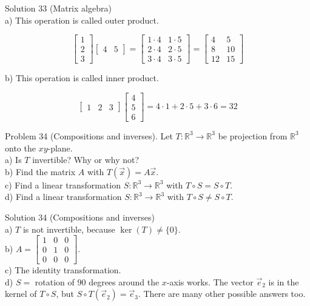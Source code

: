 \documentclass[10pt]{article}
\begin{document}
Solution 33 (Matrix algebra)\\
a) This operation is called outer product.

$$
\left[\begin{array}{l}
1 \\
2 \\
3
\end{array}\right]\left[\begin{array}{ll}
4 & 5
\end{array}\right]=\left[\begin{array}{ll}
1 \cdot 4 & 1 \cdot 5 \\
2 \cdot 4 & 2 \cdot 5 \\
3 \cdot 4 & 3 \cdot 5
\end{array}\right]=\left[\begin{array}{cc}
4 & 5 \\
8 & 10 \\
12 & 15
\end{array}\right]
$$

b) This operation is called inner product.

$$
\left[\begin{array}{lll}
1 & 2 & 3
\end{array}\right]\left[\begin{array}{l}
4 \\
5 \\
6
\end{array}\right]=4 \cdot 1+2 \cdot 5+3 \cdot 6=32
$$

Problem 34 (Compositions and inverses). Let $T: \mathbb{R}^{3} \rightarrow \mathbb{R}^{3}$ be projection from $\mathbb{R}^{3}$ onto the $x y$-plane.\\
a) Is $T$ invertible? Why or why not?\\
b) Find the matrix $A$ with $T(\vec{x})=A \vec{x}$.\\
c) Find a linear transformation $S: \mathbb{R}^{3} \rightarrow \mathbb{R}^{3}$ with $T \circ S=S \circ T$.\\
d) Find a linear transformation $S: \mathbb{R}^{3} \rightarrow \mathbb{R}^{3}$ with $T \circ S \neq S \circ T$.

Solution 34 (Compositions and inverses)\\
a) $T$ is not invertible, because $\operatorname{ker}(T) \neq\{0\}$.\\
b) $A=\left[\begin{array}{lll}1 & 0 & 0 \\ 0 & 1 & 0 \\ 0 & 0 & 0\end{array}\right]$.\\
c) The identity transformation.\\
d) $S=$ rotation of 90 degrees around the $x$-axis works. The vector $\vec{e}_{2}$ is in the kernel of $T \circ S$, but $S \circ T\left(\vec{e}_{2}\right)=\vec{e}_{3}$. There are many other possible answers too.
\end{document}
